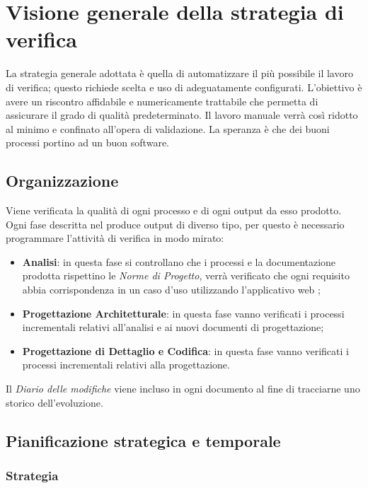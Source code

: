 \section{Visione generale della strategia di verifica}

La strategia generale adottata è quella di automatizzare il più possibile il lavoro di verifica; questo richiede scelta e uso di  adeguatamente configurati. L'obiettivo è avere un riscontro affidabile e numericamente trattabile che permetta di assicurare il grado di qualità predeterminato. Il lavoro manuale verrà così ridotto al minimo e confinato all'opera di validazione.
La speranza è che dei buoni processi portino ad un buon software.
	
	\subsection{Organizzazione}
	Viene verificata la qualità di ogni processo e di ogni output da esso prodotto. Ogni fase  descritta nel \PianoDiProgetto{} produce output di diverso tipo, per questo è necessario programmare l'attività di verifica in modo mirato:

	\begin{itemize}
		\item \textbf{Analisi}: in questa fase si controllano che i processi e la documentazione prodotta rispettino le \emph{Norme di Progetto}, verrà verificato che ogni requisito abbia corrispondenza in un caso d’uso utilizzando l’applicativo web ;
		\item \textbf{Progettazione Architetturale}: in questa fase vanno verificati i processi incrementali relativi all'analisi e ai nuovi documenti di progettazione;
		\item \textbf{Progettazione di Dettaglio e Codifica}: in questa fase vanno verificati i processi incrementali relativi alla progettazione.
	\end{itemize}
	
	Il \emph{Diario delle modifiche} viene incluso in ogni documento al fine di tracciarne uno storico dell'evoluzione.
	
	\subsection{Pianificazione strategica e temporale}
		\subsubsection{Strategia}

